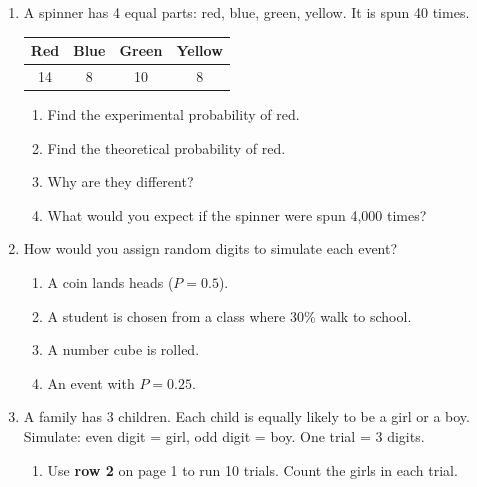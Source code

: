 \documentclass[11pt]{article}
\begin{document}
\newpage
\begin{enumerate}

\item A spinner has 4 equal parts: red, blue, green, yellow. It is spun 40 times.

\begin{center}
\renewcommand{\arraystretch}{1.3}
\begin{tabular}{|c|c|c|c|}\hline
Red & Blue & Green & Yellow \\ \hline
14 & 8 & 10 & 8 \\ \hline
\end{tabular}
\end{center}
\begin{enumerate}[itemsep=1.4em]
  \item Find the experimental probability of red. 
  \item Find the theoretical probability of red. 
  \item Why are they different? 
  \item What would you expect if the spinner were spun 4,000 times? 
\end{enumerate}
\work{1em}

\item How would you assign random digits to simulate each event?
\begin{enumerate}[itemsep=1.6em]
  \item A coin lands heads ($P = 0.5$). 
  \item A student is chosen from a class where 30\% walk to school. 
  \item A number cube is rolled. 
  \item An event with $P = 0.25$. 
\end{enumerate}

\newpage
\item A family has 3 children. Each child is equally likely to be a girl or a boy.
Simulate: even digit = girl, odd digit = boy. One trial = 3 digits.
\begin{enumerate}[itemsep=1em]
  \item Use \textbf{row 2} on page 1 to run 10 trials. Count the girls in each trial.


\end{enumerate}
\end{enumerate}
\end{document}
